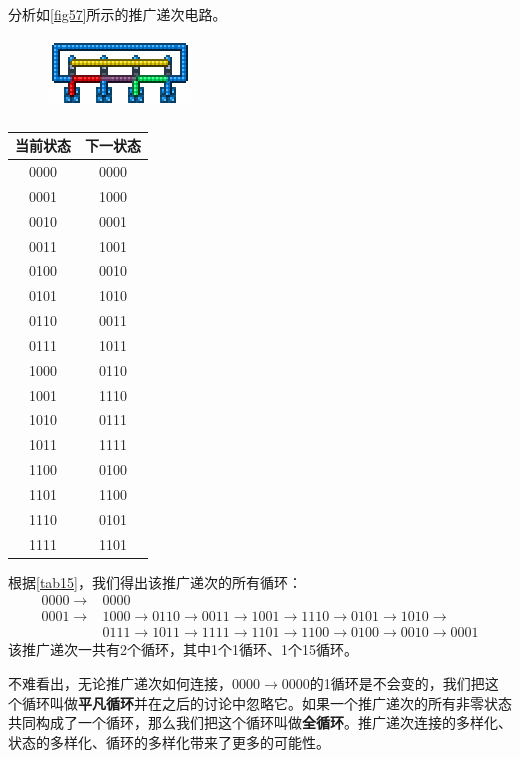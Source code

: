 \begin{example}
分析如\autoref{fig57}所示的推广递次电路。
\begin{figure}[!ht]
\centering
\includegraphics{images/426.png}
\caption{}\label{fig57}
\end{figure}
\end{example}
\begin{solution}
\begin{table}[!ht]
\centering
\begin{tabular}{|c|c|}
\hline
当前状态&下一状态\\\hline
0000&0000\\\hline
0001&1000\\\hline
0010&0001\\\hline
0011&1001\\\hline
0100&0010\\\hline
0101&1010\\\hline
0110&0011\\\hline
0111&1011\\\hline
1000&0110\\\hline
1001&1110\\\hline
1010&0111\\\hline
1011&1111\\\hline
1100&0100\\\hline
1101&1100\\\hline
1110&0101\\\hline
1111&1101\\\hline
\end{tabular}
\caption{}\label{tab15}
\end{table}
根据\autoref{tab15}，我们得出该推广递次的所有循环：
\begin{align*}
0000\to &0000\\
0001\to &1000\to 0110\to 0011\to 1001\to 1110\to 0101\to 1010\to \\
        &0111\to 1011\to 1111\to 1101\to 1100\to 0100\to 0010\to 0001
\end{align*}
该推广递次一共有2个循环，其中1个1循环、1个15循环。
\end{solution}

不难看出，无论推广递次如何连接，$0000\to 0000$的1循环是不会变的，我们把这个循环叫做\textbf{平凡循环}并在之后的讨论中忽略它。如果一个推广递次的所有非零状态共同构成了一个循环，那么我们把这个循环叫做\textbf{全循环}。推广递次连接的多样化、状态的多样化、循环的多样化带来了更多的可能性。

